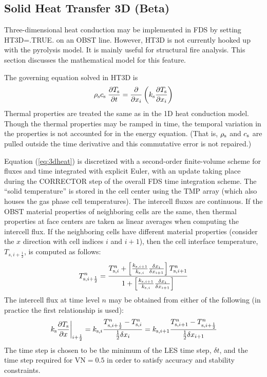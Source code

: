 \subsection{Solid Heat Transfer 3D (Beta)}
\label{sec:ht3d}

Three-dimensional heat conduction may be implemented in FDS by setting {\ct HT3D=.TRUE.} on an {\ct OBST} line.  However, {\ct HT3D} is not currently hooked up with the pyrolysis model.  It is mainly useful for structural fire analysis. This section discusses the mathematical model for this feature.

The governing equation solved in {\ct HT3D} is
\begin{equation}
  \rho_{\rm s} c_{\rm s} \; \frac{\partial T_{\rm s}}{\partial t} = \frac{\partial }{\partial x_i} \left( k_{\rm s} \frac{\partial T_{\rm s}}{\partial x_i} \right)
  \label{eq:3dheat}
\end{equation}
Thermal properties are treated the same as in the 1D heat conduction model.  Though the thermal properties may be ramped in time, the temporal variation in the properties is not accounted for in the energy equation. (That is, $\rho_{\rm s}$ and $c_{\rm s}$ are pulled outside the time derivative and this commutative error is not repaired.)

Equation (\ref{eq:3dheat}) is discretized with a second-order finite-volume scheme for fluxes and time integrated with explicit Euler, with an update taking place during the {\ct CORRECTOR} step of the overall FDS time integration scheme.  The ``solid temperature'' is stored in the cell center using the {\ct TMP} array (which also houses the gas phase cell temperatures).  The intercell fluxes are continuous.  If the {\ct OBST} material properties of neighboring cells are the same, then thermal properties at face centers are taken as linear averages when computing the intercell flux.  If the neighboring cells have different material properties (consider the $x$ direction with cell indices $i$ and $i+1$), then the cell interface temperature, $T_{s,i+\frac{1}{2}}$, is computed as follows:
\begin{equation}
\label{eq:interface_tmp}
T_{{\rm s},i+\frac{1}{2}}^n = \frac{T_{{\rm s},i}^n + \left[\frac{k_{{\rm s},i+1}}{k_{{\rm s},i}} \frac{\delta x_i}{\delta x_{i+1}}\right] T_{{\rm s},i+1}^n}{1 + \left[\frac{k_{{\rm s},i+1}}{k_{{\rm s},i}} \frac{\delta x_i}{\delta x_{i+1}}\right]}
\end{equation}
The intercell flux at time level $n$ may be obtained from either of the following (in practice the first relationship is used):
\begin{equation}
\label{eq:intercell_flux}
\left. k_{\rm s} \frac{\partial T_{\rm s}}{\partial x} \right|_{i+\frac{1}{2}} = k_{{\rm s},i} \frac{T_{{\rm s},i+\frac{1}{2}}^n - T_{{\rm s},i}^n}{\frac{1}{2}\delta x_i} = k_{{\rm s},i+1} \frac{T_{{\rm s},i+1}^n - T_{{\rm s},i+\frac{1}{2}}^n}{\frac{1}{2}\delta x_{i+1}}
\end{equation}
The time step is chosen to be the minimum of the LES time step, $\delta t$, and the time step required for $\mathrm{VN}=0.5$ in order to satisfy accuracy and stability constraints.

